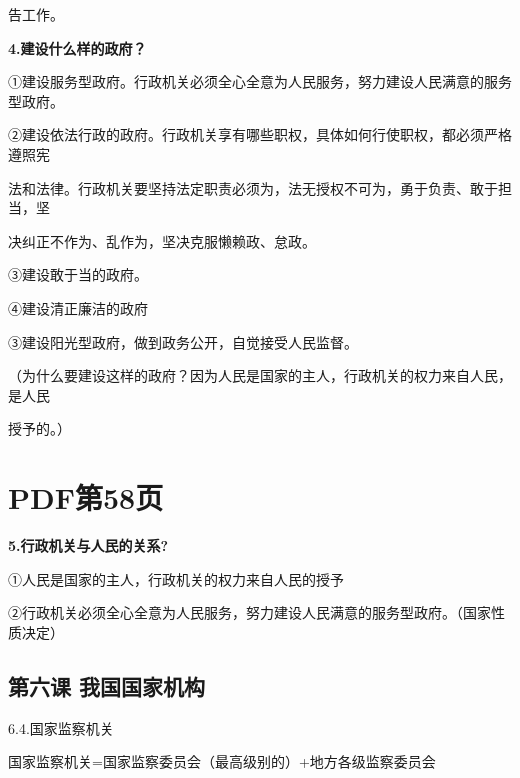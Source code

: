\documentclass[lang=cn,11pt]{elegantbook}
\newcommand{\daofasym}[1]{{\daofasymbolfont #1}}
\newcommand{\daofasym}[1]{#1}
\begin{document}
告工作。\par

\textbf{4.建设什么样的政府？}\par

\daofasym{①}建设服务型政府。行政机关必须全心全意为人民服务，努力建设人民满意的服务型政府。\par

\daofasym{②}建设依法行政的政府。行政机关享有哪些职权，具体如何行使职权，都必须严格遵照宪\par

法和法律。行政机关要坚持法定职责必须为，法无授权不可为，勇于负责、敢于担当，坚\par

决纠正不作为、乱作为，坚决克服懒赖政、怠政。\par

\daofasym{③}建设敢于当的政府。\par

\daofasym{④}建设清正廉洁的政府\par

\daofasym{③}建设阳光型政府，做到政务公开，自觉接受人民监督。\par

（为什么要建设这样的政府？因为人民是国家的主人，行政机关的权力来自人民，是人民\par

授予的。）\par


\section*{PDF第58页}

\textbf{5.行政机关与人民的关系?}\par

\daofasym{①}人民是国家的主人，行政机关的权力来自人民的授予\par

\daofasym{②}行政机关必须全心全意为人民服务，努力建设人民满意的服务型政府。（国家性质决定）\par

\subsection*{第六课 我国国家机构}

6.4.国家监察机关\par

国家监察机关=国家监察委员会（最高级别的）+地方各级监察委员会\par
\end{document}
